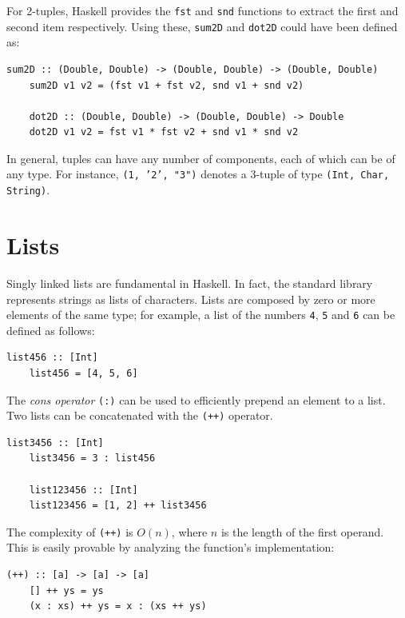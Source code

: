 \documentclass[UdineBachThesis,american,11pt]{PhdThesis}
\begin{document}
  For 2-tuples, Haskell provides the \mbox{\texttt{fst}} and \mbox{\texttt{snd}}
  functions to extract the first and second item respectively. Using these,
  \mbox{\texttt{sum2D}} and \mbox{\texttt{dot2D}} could have been defined as:

  \begin{Verbatim}[gobble=4,fontsize=\small]
    sum2D :: (Double, Double) -> (Double, Double) -> (Double, Double)
    sum2D v1 v2 = (fst v1 + fst v2, snd v1 + snd v2)

    dot2D :: (Double, Double) -> (Double, Double) -> Double
    dot2D v1 v2 = fst v1 * fst v2 + snd v1 * snd v2
  \end{Verbatim}

  In general, tuples can have any number of components, each of which can be of
  any type. For instance, \mbox{\texttt{(1, '2', "3")}} denotes a 3-tuple of
  type \mbox{\texttt{(Int, Char, String)}}.

  \section{Lists}

  Singly linked lists are fundamental in Haskell. In fact, the standard library
  represents strings as lists of characters. Lists are composed by zero or more
  elements of the same type; for example, a list of the numbers \texttt{4},
  \texttt{5} and \texttt{6} can be defined as follows:

  \begin{Verbatim}[gobble=4,fontsize=\small]
    list456 :: [Int]
    list456 = [4, 5, 6]
  \end{Verbatim}

  The \emph{cons operator} \mbox{\texttt{(:)}} can be used to efficiently
  prepend an element to a list. Two lists can be concatenated with the
  \mbox{\texttt{(++)}} operator.

  \begin{Verbatim}[gobble=4,fontsize=\small]
    list3456 :: [Int]
    list3456 = 3 : list456

    list123456 :: [Int]
    list123456 = [1, 2] ++ list3456
  \end{Verbatim}

  The complexity of \mbox{\texttt{(++)}} is
  \mbox{$O\mathopen{}\left(n\right)\mathclose{}$}, where $n$ is the length of
  the first operand. This is easily provable by analyzing the function's
  implementation:

  \begin{Verbatim}[gobble=4,fontsize=\small]
    (++) :: [a] -> [a] -> [a]
    [] ++ ys = ys
    (x : xs) ++ ys = x : (xs ++ ys)
  \end{Verbatim}
\end{document}
